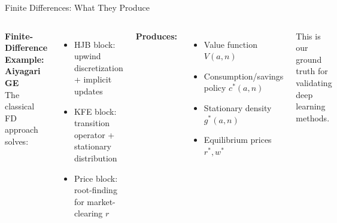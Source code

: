 \documentclass[aspectratio=169,11pt]{beamer}
\newcommand{\emphc}[1]{\textcolor{harvardcrimson}{#1}}
\begin{document}
\begin{frame}{Finite Differences: What They Produce}
\footnotesize
\begin{columns}[T]
\textbf{Finite-Difference Example: Aiyagari GE}\\[1pt]
The classical FD approach solves:
\begin{itemize}\itemsep0pt
    \item HJB block: upwind discretization + implicit updates
    \item KFE block: transition operator + stationary distribution
    \item Price block: root-finding for market-clearing $r$
\end{itemize}

\vspace{0.15em}
\textbf{Produces:}
\begin{itemize}\itemsep0pt
    \item Value function $V(a, n)$
    \item Consumption/savings policy $c^*(a, n)$
    \item Stationary density $g^*(a, n)$
    \item Equilibrium prices $r^*, w^*$
\end{itemize}

\vspace{0.15em}
\emphc{This is our ground truth} for validating deep learning methods.

\begin{center}


\end{center}
\end{columns}
\end{frame}
\end{document}
